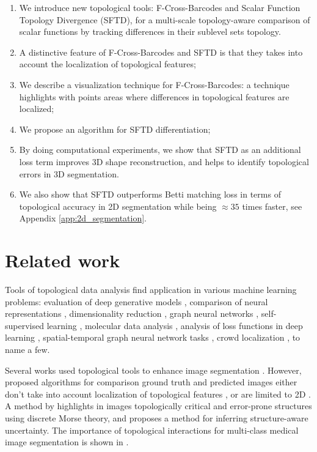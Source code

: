 \documentclass[runningheads]{llncs}
\begin{document}
\begin{enumerate}
\item We introduce new topological tools: F-Cross-Barcodes and Scalar Function Topology Divergence (SFTD), for a multi-scale topology-aware comparison of scalar functions by tracking differences in their sublevel sets topology.
\item A distinctive feature of F-Cross-Barcodes and SFTD is that they takes into account the localization of topological features;
\item We describe a visualization technique for F-Cross-Barcodes: a technique highlights with points areas where differences in topological features are localized;
\item We propose an algorithm for SFTD differentiation; 
\item By doing computational experiments, we show that SFTD as an additional loss term improves 3D shape reconstruction, and helps to identify topological errors in 3D segmentation.
\item We also show that SFTD outperforms Betti matching loss in terms of topological accuracy in 2D segmentation while being $\approx35$ times faster, see Appendix \ref{app:2d_segmentation}.
\end{enumerate}

\section{Related work}

Tools of topological data analysis find application in various machine learning problems: evaluation of deep generative models \cite{barannikov2021manifold}, comparison of neural representations \cite{barannikov2021representation}, dimensionality reduction \cite{moor2020topological,trofimov2023learning}, 
graph neural networks \cite{horn2021topological, yan2021link, carriere2020perslay}, self-supervised learning \cite{luo2023improving}, molecular data analysis \cite{demir2022todd}, analysis of loss functions in deep learning \cite{barannikov2023barcodes, barannikov2020topological}, spatial-temporal graph neural network tasks \cite{chen2022tamp, chen2021z}, crowd localization \cite{abousamra2021localization}, to name a few. 


Several works used topological tools to enhance image segmentation \cite{hu2019topology, hu2021topology, stucki2023topologically, gupta2024topology}. 
However, proposed algorithms for comparison ground truth and predicted images either don't take into account localization of topological features \cite{hu2019topology}, or are limited to 2D \cite{stucki2023topologically}.
A method by \cite{hu2021topology} highlights in images topologically critical and error-prone structures using discrete Morse theory, and \cite{gupta2024topology} proposes a method for inferring structure-aware uncertainty. 
The importance of topological interactions for multi-class medical image segmentation is shown in \cite{gupta2022learning}.
\end{document}
